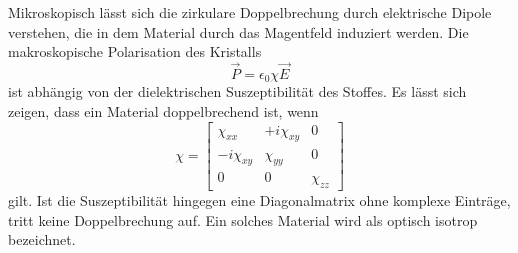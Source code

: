 \noindent
Mikroskopisch lässt sich die zirkulare Doppelbrechung durch elektrische Dipole verstehen, die in dem Material durch das 
Magentfeld induziert werden. Die makroskopische Polarisation des Kristalls 
\begin{equation*}
    \vec{P}=\epsilon_0\chi\vec{E}
\end{equation*}
ist abhängig von der dielektrischen Suszeptibilität des Stoffes. Es lässt sich zeigen, dass ein Material doppelbrechend ist, wenn
\begin{equation}
    \chi=
    \left[
        \begin{array}{ccc}
        \chi_{xx}          & +i\chi_{xy} & 0         \\ 
        -i\chi_{xy}   & \chi_{yy}        & 0         \\
        0                  & 0                & \chi_{zz}
    \end{array}
    \right]
    \label{eqn:chi}
\end{equation}
gilt. Ist die Suszeptibilität hingegen eine Diagonalmatrix ohne komplexe Einträge, tritt keine Doppelbrechung auf. Ein solches 
Material wird als optisch isotrop bezeichnet. 

